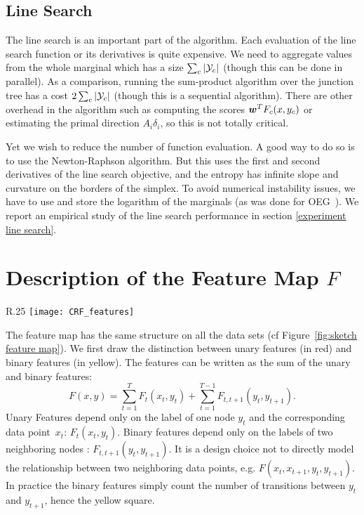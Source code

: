 \begin{subappendices}
	\subsection{Line Search} \label{app:sec:implementation line search}
	The line search is an important part of the algorithm.
	Each evaluation of the line search function or its derivatives is quite expensive.
	We need to aggregate values from the whole marginal which has a size $\sum_c | {\mathcal Y}_c |$ (though this can be done in parallel).
	As a comparison, running the sum-product algorithm over the junction tree has a cost $2\sum_c | {\mathcal Y}_c |$ (though this is a sequential algorithm).
	There are other overhead in the algorithm such as computing the scores $\boldsymbol{w}^T F_c(x, y_c)$ or estimating the primal direction $A_i \delta_i$, so this is not totally critical.

	Yet we wish to reduce the number of function evaluation.
	A good way to do so is to use the Newton-Raphson algorithm.
	But this uses the first and second derivatives of the line search objective, and the entropy has infinite slope and curvature on the borders of the simplex.
	To avoid numerical instability issues, we have to use and store the logarithm of the marginals (as was done for OEG~\citep{collins2008exponentiated}).
	We report an empirical study of the line search performance in section \ref{experiment line search}.

	\section{Description of the Feature Map $F$}
	\label{app:feature}
	\begin{wrapfigure}[20]{R}{.25\textwidth}
		\centering
		\texttt{[image: CRF\_features]}
		\caption[Sketch of sequence feature maps]{Sketch of the feature map. K is the number of different labels for one node. A is the number of attributes.}
		\label{fig:sketch feature map}
	\end{wrapfigure}

	The feature map has the same structure on all the data sets (cf Figure~\ref{fig:sketch feature map}).
	We first draw the distinction between unary features (in red) and binary features (in yellow). The features can be written as the sum of the unary and binary features:
	\begin{equation*}
		F(x, y) = \sum_{t=1}^T F_t(x_t, y_t) +  \sum_{t=1}^{T-1} F_{t, t+1}(y_t, y_{t+1}).
	\end{equation*}
	Unary Features depend only on the label of one node $y_t$ and the corresponding data point~$x_t$: $F_t(x_t, y_t)$.
	Binary features depend only on the labels of two neighboring nodes : $F_{t, t+1}(y_t, y_{t+1})$.
	It is a design choice not to directly model the relationship between two neighboring data points, e.g. $F(x_t, x_{t+1}, y_t, y_{t+1})$.
	In practice the binary features simply count the number of transitions between $y_t$ and $y_{t+1}$, hence the yellow square.


\end{subappendices}
